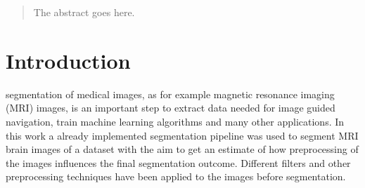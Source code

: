 \documentclass[journal]{IEEEtran}
\begin{document}







\maketitle

\begin{abstract}
The abstract goes here.
\end{abstract}








%
\IEEEpeerreviewmaketitle



\section{Introduction}
% 
% 
% 
% 
 segmentation of medical images, as for example magnetic resonance imaging (MRI) images, is an important step to extract data needed for image guided navigation, train machine learning algorithms and many other applications. In this work a already implemented segmentation pipeline was used to segment MRI brain images of a dataset with the aim to get an estimate of how preprocessing of the images influences the final segmentation outcome. Different filters and other preprocessing techniques have been applied to the images before segmentation.
\end{document}

